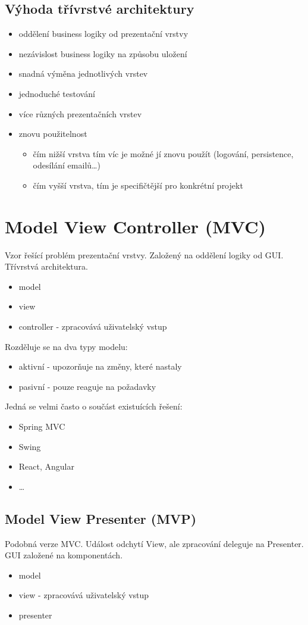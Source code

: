 \documentclass{szzclass}
\begin{document}
\subsection{Výhoda třívrstvé architektury}
\begin{itemize}
    \item oddělení business logiky od prezentační vrstvy
    \item nezávislost business logiky na způsobu uložení
    \item snadná výměna jednotlivých vrstev
    \item jednoduché testování
    \item více různých prezentačních vrstev
    \item znovu použitelnost
    \begin{itemize}
        \item čím nižší vrstva tím víc je možné jí znovu použít (logování, persistence, odesílání emailů\dots)
        \item čím vyšší vrstva, tím je specifičtější pro konkrétní projekt
    \end{itemize}
\end{itemize}
\section{Model View Controller (MVC)}
Vzor řešící problém prezentační vrstvy. Založený na oddělení logiky od GUI. Třívrstvá architektura.
\begin{itemize}
    \item model
    \item view
    \item controller - zpracovává uživatelský vstup
\end{itemize}
Rozděluje se na dva typy modelu:
\begin{itemize}
    \item aktivní - upozorňuje na změny, které nastaly
    \item pasivní - pouze reaguje na požadavky
\end{itemize}
Jedná se velmi často o součást existuících řešení:
\begin{itemize}
    \item Spring MVC
    \item Swing
    \item React, Angular
    \item \dots
\end{itemize} 
\subsection{Model View Presenter (MVP)}
Podobná verze MVC. Událost odchytí View, ale zpracování deleguje na Presenter. GUI založené na  komponentách.
\begin{itemize}
    \item model
    \item view - zpracovává uživatelský vstup
    \item presenter
\end{itemize}
\end{document}
